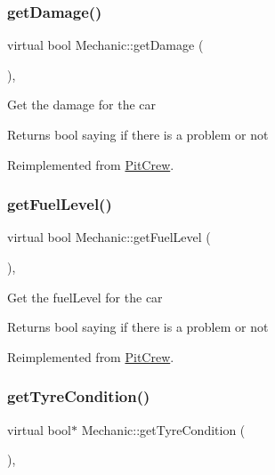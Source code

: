 \subsubsection{\texorpdfstring{get\+Damage()}{getDamage()}}
{\footnotesize\ttfamily virtual bool Mechanic\+::get\+Damage (\begin{DoxyParamCaption}{ }\end{DoxyParamCaption})\hspace{0.3cm}{\ttfamily [inline]}, {\ttfamily [virtual]}}

Get the damage for the car \begin{DoxyReturn}{Returns}
bool saying if there is a problem or not 
\end{DoxyReturn}


Reimplemented from \mbox{\hyperlink{class_pit_crew_a0cd6a3161f5b016241b3a6a51d526c4f}{Pit\+Crew}}.

\mbox{\label{class_mechanic_a0479343f19d2ea34942e3c3bd0b14391}} 
\subsubsection{\texorpdfstring{get\+Fuel\+Level()}{getFuelLevel()}}
{\footnotesize\ttfamily virtual bool Mechanic\+::get\+Fuel\+Level (\begin{DoxyParamCaption}{ }\end{DoxyParamCaption})\hspace{0.3cm}{\ttfamily [inline]}, {\ttfamily [virtual]}}

Get the fuel\+Level for the car \begin{DoxyReturn}{Returns}
bool saying if there is a problem or not 
\end{DoxyReturn}


Reimplemented from \mbox{\hyperlink{class_pit_crew_a6960d91ce635df7f846301e21ae64450}{Pit\+Crew}}.

\mbox{\label{class_mechanic_aed7f46c76c75b647527c041ff5082f6e}} 
\subsubsection{\texorpdfstring{get\+Tyre\+Condition()}{getTyreCondition()}}
{\footnotesize\ttfamily virtual bool$\ast$ Mechanic\+::get\+Tyre\+Condition (\begin{DoxyParamCaption}{ }\end{DoxyParamCaption})\hspace{0.3cm}{\ttfamily [inline]}, {\ttfamily [virtual]}}

